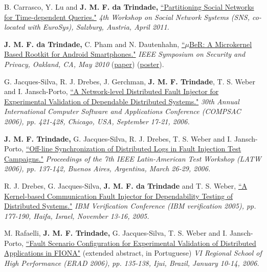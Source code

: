 \documentclass[line,margin]{res}
\begin{document}
\begin{resume}
B. Carrasco, Y. Lu and \textbf{J. M. F. da Trindade,} \href{http://research.microsoft.com/en-us/projects/ldg/a04-carrasco.pdf}{``Partitioning Social Networks for Time-dependent Queries."} \textit{4th Workshop on Social Network Systems (SNS, co-located with EuroSys), Salzburg, Austria, April 2011.}

\textbf{J. M. F. da Trindade,} C. Pham and N. Dautenhahn, \href{http://joanatrindade.wikidot.com/local--files/curriculum/oakland2010-paper.pdf}{``$\mu$BeR: A Microkernel Based Rootkit for Android Smartphones."} \textit{IEEE Symposium on Security and Privacy, Oakland, CA, May 2010} (\href{http://joanatrindade.wikidot.com/local--files/curriculum/oakland2010-paper.pdf}{paper}) (\href{http://joanatrindade.wikidot.com/local--files/curriculum/oakland2010-poster.pdf}{poster}).

G. Jacques-Silva, R. J. Drebes, J. Gerchman, \textbf{J. M. F. Trindade}, T. S. Weber and I. Jansch-Porto, \href{http://doi.ieeecomputersociety.org/10.1109/COMPSAC.2006.12}{``A Network-level Distributed Fault Injector for Experimental Validation of Dependable Distributed Systems."} \textit{30th Annual International Computer Software and Applications Conference (COMPSAC 2006), pp. 421-428, Chicago, USA, September 17-21, 2006.}

\textbf{J. M. F. Trindade,} G. Jacques-Silva, R. J. Drebes, T. S. Weber and I. Jansch-Porto, \href{http://joanatrindade.wikidot.com/local--files/curriculum/latw2006.pdf}{``Off-line Synchronization of Distributed Logs in Fault Injection Test Campaigns."} \textit{Proceedings of the 7th IEEE Latin-American Test Workshop (LATW 2006), pp. 137-142, Buenos Aires, Argentina, March 26-29, 2006.}

R. J. Drebes, G. Jacques-Silva, \textbf{J. M. F. da Trindade} and T. S. Weber, \href{http://www.haifa.ibm.com/Workshops/PADTAD2005/papers/drebes.pdf}{``A Kernel-based Communication Fault Injector for Dependability Testing of Distributed Systems."} \textit{IBM Verification Conference (IBM verification 2005), pp. 177-190, Haifa, Israel, November 13-16, 2005.}

M. Rafaelli, \textbf{J. M. F. Trindade,} G. Jacques-Silva, T. S. Weber and I. Jansch-Porto, \href{http://joanatrindade.wikidot.com/local--files/curriculum/erad2006.pdf}{``Fault Scenario Configuration for Experimental Validation of Distributed Applications in FIONA"} (extended abstract, in Portuguese) \textit{VI Regional School of High Performance (ERAD 2006), pp. 135-138, Ijui, Brazil, January 10-14, 2006.}


\end{resume}
\end{document}
